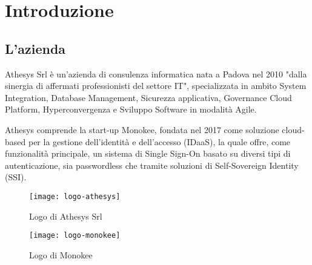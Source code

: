 
\chapter{Introduzione}
\label{cap:introduzione}






\section{L'azienda}

Athesys Srl è un'azienda di consulenza informatica nata a Padova nel 2010 "dalla sinergia di affermati professionisti del settore IT", specializzata in ambito System Integration, Database Management, Sicurezza applicativa, Governance Cloud Platform, Hyperconvergenza e
Sviluppo Software in modalità Agile.

Athesys comprende la start-up Monokee, fondata nel 2017 come soluzione cloud-based per la gestione dell'identità
e dell'accesso (IDaaS), la quale offre, come funzionalità principale, un sistema di Single Sign-On basato 
su diversi tipi di autenticazione, sia passwordless che tramite soluzioni di Self-Sovereign Identity (SSI).

\vspace{20pt}
\begin{figure}[!h] 
    \centering 
    \texttt{[image: logo-athesys]} 
    \caption{Logo di Athesys Srl}
\end{figure}

\begin{figure}[!h] 
    \centering 
    \texttt{[image: logo-monokee]} 
    \caption{Logo di Monokee}
\end{figure}
    

